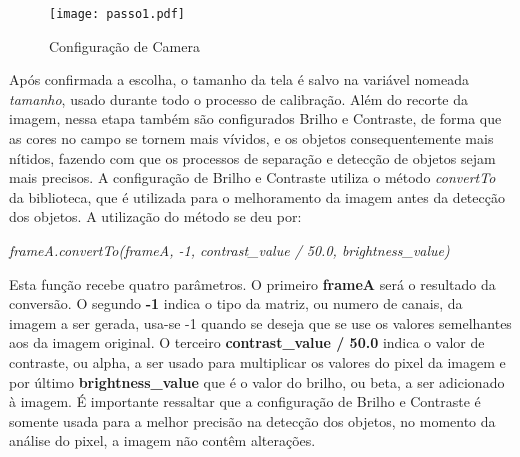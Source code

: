 \begin{figure}[H]
			\centering
			\texttt{[image: passo1.pdf]}
			\caption{ Configuração de Camera}
			\label{Configuracao}
		\end{figure}		


 Após confirmada a escolha, o tamanho da tela é salvo na variável nomeada \emph{tamanho}, usado durante todo o processo de calibração.
Além do recorte da imagem, nessa etapa também são configurados Brilho e Contraste, de forma que as cores no campo se tornem mais vívidos, e os objetos consequentemente mais nítidos, fazendo com que os processos de separação e detecção de objetos sejam mais precisos. A configuração de Brilho e Contraste utiliza o método \textit{convertTo} da biblioteca, que é utilizada para o melhoramento da imagem antes da detecção dos objetos. A utilização do método se deu por:
\begin{center}
\centering \textit{ frameA.convertTo(frameA, -1, contrast\_value / 50.0, brightness\_value)}
\end{center}
Esta função recebe quatro parâmetros. O primeiro \textbf{frameA} será o resultado da conversão. O segundo \textbf{-1} indica o tipo da matriz, ou numero de canais, da imagem a ser gerada, usa-se -1 quando se deseja que se use os valores semelhantes aos da imagem original\cite{OpenCV}. O terceiro \textbf{contrast\_value / 50.0} indica o valor de contraste, ou alpha, a ser usado para multiplicar os valores do pixel da imagem\cite{OpenCV} e por último \textbf{brightness\_value} que é o valor do brilho, ou beta, a ser adicionado à imagem. É importante ressaltar que a configuração de Brilho e Contraste é somente usada para a melhor precisão na detecção dos objetos, no momento da análise do pixel, a imagem não contêm alterações.\newline

